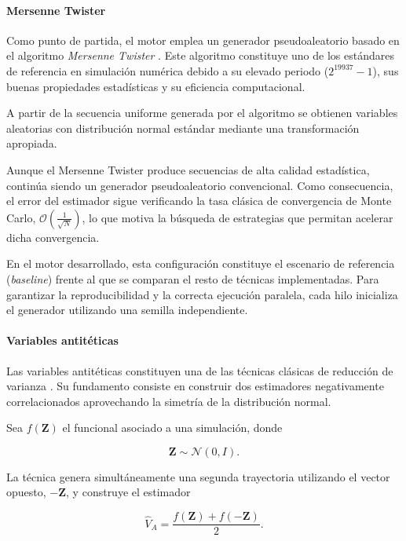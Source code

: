 \documentclass[11pt]{article}
\begin{document}
\paragraph{Mersenne Twister}

Como punto de partida, el motor emplea un generador pseudoaleatorio basado en el algoritmo \emph{Mersenne Twister} \cite{matsumoto1998mersenne}. Este algoritmo constituye uno de los estándares de referencia en simulación numérica debido a su elevado periodo ($2^{19937}-1$), sus buenas propiedades estadísticas y su eficiencia computacional.

A partir de la secuencia uniforme generada por el algoritmo se obtienen variables aleatorias con distribución normal estándar mediante una transformación apropiada.

Aunque el Mersenne Twister produce secuencias de alta calidad estadística, continúa siendo un generador pseudoaleatorio convencional. Como consecuencia, el error del estimador sigue verificando la tasa clásica de convergencia de Monte Carlo, $\mathcal{O}\left(\frac{1}{\sqrt{N}}\right)$, lo que motiva la búsqueda de estrategias que permitan acelerar dicha convergencia.

En el motor desarrollado, esta configuración constituye el escenario de referencia (\emph{baseline}) frente al que se comparan el resto de técnicas implementadas. Para garantizar la reproducibilidad y la correcta ejecución paralela, cada hilo inicializa el generador utilizando una semilla independiente.

\paragraph{Variables antitéticas}

Las variables antitéticas constituyen una de las técnicas clásicas de reducción de varianza \cite{hammersley1956new}. Su fundamento consiste en construir dos estimadores negativamente correlacionados aprovechando la simetría de la distribución normal.

Sea $f(\mathbf{Z})$ el funcional asociado a una simulación, donde

\begin{equation}
\mathbf{Z}\sim\mathcal{N}(0,I).
\end{equation}

La técnica genera simultáneamente una segunda trayectoria utilizando el vector opuesto, $-\mathbf{Z}$, y construye el estimador

\begin{equation}
\hat{V}_{A}=
\frac{f(\mathbf{Z})+f(-\mathbf{Z})}{2}.
\end{equation}
\end{document}
